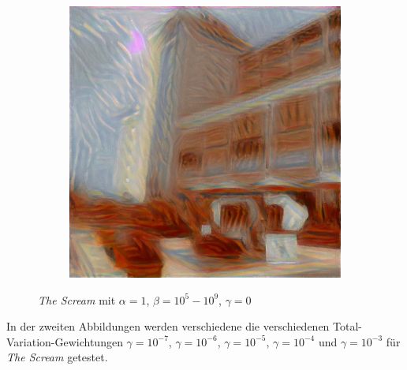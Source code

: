 \begin{figure}[H]
\begin{subfigure}[h]{0.15\textwidth}
    \end{subfigure}
    \begin{subfigure}[h]{0.15\textwidth}
        \centering
        \includegraphics[width=\textwidth]{resources/content/experiments/a__the_scream__768x768__style-weight_1e+09__tv-weight_0e+00.jpg}
    \end{subfigure}
    \caption{\textit{The Scream} mit $ \alpha = 1 $, $ \beta = 10^{5} - 10^{9} $, $ \gamma = 0 $}
\end{figure}

In der zweiten Abbildungen werden verschiedene die verschiedenen Total-Variation-Gewichtungen $ \gamma = 10^{-7} $, $ \gamma = 10^{-6} $, $ \gamma = 10^{-5} $, $ \gamma = 10^{-4} $ und $ \gamma = 10^{-3} $ für \textit{The Scream} getestet.

